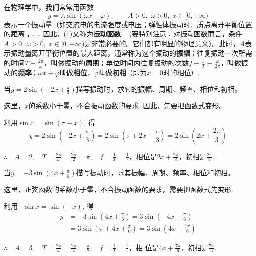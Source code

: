 在物理学中，我们常常用函数
\begin{equation}
    y=A\sin(\omega x+\varphi),\qquad A>0,\; \omega>0,\; x\in[0,+\infty) \tag{1}
\end{equation}
表示一个振动量（如交流电的电流强度或电压；弹性体振动时，质点离开平衡位置的距离；…… 因此，(1)又称为\textbf{振动函数}. （要特别注意：对振动函数而言，条件$A>0,\; \omega>0,\; x\in[0,+\infty)$是非常必要的。它们都有明显的物理意义）。此时，$A$表示振动量离开平衡位置的最大距离，通常称为这个振动的\textbf{振幅}；往复振动一次所需的时间$T=\frac{2\pi}{\omega}$，叫做振动的\textbf{周期}；单位时间内往复振动的次数$f=\frac{1}{T}=\frac{\omega}{2\pi}$，叫做振动的\textbf{频率}；$\omega x+\varphi$叫做\textbf{相位}，$\varphi$叫做\textbf{初相}（即为$x=0$时的相位）.


\begin{example}
当$y=2\sin\left(-2x+\frac{\pi}{3}\right)$描写振动时，求它的振幅、周期、频率、相位和初相。
\end{example}

\begin{analyze}
    这里，$x$的系数小于零，不合振动函数的要求. 因此，先要把函数式变形。
\end{analyze}

\begin{solution}
利用$\sin x=\sin(\pi-x)$, 得
\[y=2\sin\left(-2x+\frac{\pi}{3}\right)=2\sin\left(\pi+2x-\frac{\pi}{3}\right)=2\sin\left(2x+\frac{2\pi}{3}\right)\]

$\therefore\quad 
A=2,\quad T=\frac{2\pi}{\omega}=\frac{2\pi}{2}=\pi,\quad f=\frac{1}{T}=\frac{1}{\pi}$，相位是$2x+\frac{2\pi}{3}$，初相是$\frac{2\pi}{3}$.
\end{solution}



\begin{example}
    当$y=-3\sin\left(4x+\frac{\pi}{6}\right)$描写振动时，求其振幅、周期、频率、相位和初相。
\end{example}

\begin{analyze}
这里，正弦函数的系数小于零，不合振动函数的要求，需要把函数式先变形.
\end{analyze}

\begin{solution}
    利用$-\sin x=\sin(-x)$, 得
\[\begin{split}
    y&=-3\sin\left(4x+\frac{\pi}{6}\right)=3\sin\left(-4x-\frac{\pi}{6}\right)\\
    &=3\sin\left(\pi+4x+\frac{\pi}{6}\right)=3\sin\left(4x+\frac{7\pi}{6}\right)
\end{split}\]

$\therefore\quad A=3,\quad T=\frac{2\pi}{\omega}=\frac{2\pi}{4}=\frac{\pi}{2},\quad f=\frac{1}{T}=\frac{2}{\pi}$，相
位是$4x+\frac{7\pi}{6}$，初相是$\frac{7\pi}{6}$.
\end{solution}

